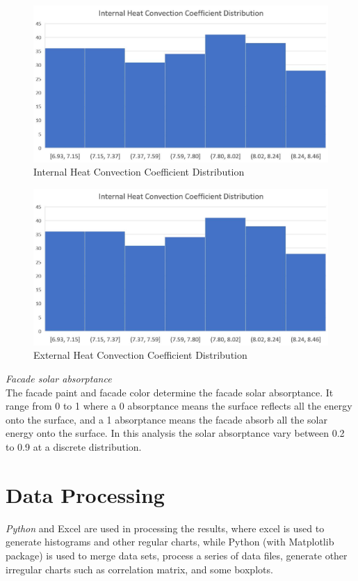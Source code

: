 \documentclass[a4paper, oneside]{discothesis}
\begin{document}
			\begin{figure}[ht!]
			\centering
			\includegraphics[scale=0.35]{Hongger_InConvDist.jpg}
			\caption{Internal Heat Convection Coefficient Distribution}
			\label{fig:HonggerIntConvDist}
			\end{figure}
			
			\begin{figure}[ht!]
			\centering
			\includegraphics[scale=0.35]{Hongger_InConvDist.jpg}
			\caption{External Heat Convection Coefficient Distribution}
			\label{fig:HonggerExtConvDist}
			\end{figure}
			
		\textit{Facade solar absorptance}\\
			The facade paint and facade color determine the facade solar absorptance. It range from 0 to 1 where a 0 absorptance means the surface reflects all the energy onto the surface, and a 1 absorptance means the facade absorb all the solar energy onto the surface. In this analysis the solar absorptance vary between 0.2 to 0.9 at a discrete distribution.

	\section{Data Processing}
		\textit{Python} and Excel are used in processing the results, where excel is used to generate histograms and other regular charts, while Python (with Matplotlib package) is used to merge data sets, process a series of data files, generate other irregular charts such as correlation matrix, and some boxplots.
\end{document}
